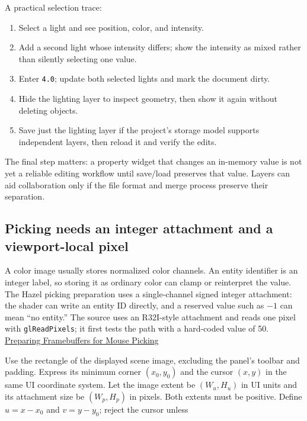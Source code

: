 A practical selection trace:

\begin{enumerate}
\def\labelenumi{\arabic{enumi}.}
\tightlist
\item
  Select a light and see position, color, and intensity.
\item
  Add a second light whose intensity differs; show the intensity as mixed rather than silently selecting one value.
\item
  Enter \texttt{4.0}; update both selected lights and mark the document dirty.
\item
  Hide the lighting layer to inspect geometry, then show it again without deleting objects.
\item
  Save just the lighting layer if the project's storage model supports independent layers, then reload it and verify the edits.
\end{enumerate}

The final step matters: a property widget that changes an in-memory value is not yet a reliable editing workflow until save/load preserves that value. Layers can aid collaboration only if the file format and merge process preserve their separation.

\subsection{Picking needs an integer attachment and a viewport-local pixel}\label{06-engine-ii-ch032-picking-needs-an-integer-attachment-and-a-viewport-local-pixel}

A color image usually stores normalized color channels. An entity identifier is an integer label, so storing it as ordinary color can clamp or reinterpret the value. The Hazel picking preparation uses a single-channel signed integer attachment: the shader can write an entity ID directly, and a reserved value such as \(-1\) can mean ``no entity.'' The source uses an R32I-style attachment and reads one pixel with \texttt{glReadPixels}; it first tests the path with a hard-coded value of 50. \href{https://www.youtube.com/watch?v=wYVaIOUhz6s}{Preparing Framebuffers for Mouse Picking}

Use the rectangle of the displayed scene image, excluding the panel's toolbar and padding. Express its minimum corner \((x_0,y_0)\) and the cursor \((x,y)\) in the same UI coordinate system. Let the image extent be \((W_u,H_u)\) in UI units and its attachment size be \((W_p,H_p)\) in pixels. Both extents must be positive. Define \(u=x-x_0\) and \(v=y-y_0\); reject the cursor unless

